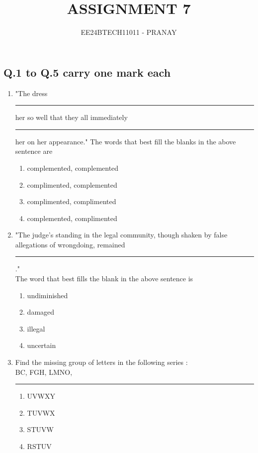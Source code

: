 \documentclass[journal,12pt,onecolumn]{IEEEtran}
\theoremstyle{remark}
\begin{document}

\vspace{3cm}

\title{ASSIGNMENT 7}
\author{EE24BTECH11011 - PRANAY}
\maketitle

\bigskip

\renewcommand{\thefigure}{\theenumi}
\renewcommand{\thetable}{\theenumi}
\subsection{\textbf{Q.1 to Q.5 carry one mark each}}
   \begin{enumerate}
  \item  "The dress \rule{3cm}{0.15mm} her so well that they all immediately \rule{3cm}{0.15mm} her on her
appearance."
The words that best fill the blanks in the above sentence are
\begin{enumerate}
    \item complemented, complemented
    \item complimented, complemented
    \item  complimented, complimented
    \item complemented, complimented
\end{enumerate}
\item "The judge's standing in the legal community, though shaken by false allegations of
wrongdoing, remained \rule{3cm}{0.15mm}."\\
The word that best fills the blank in the above sentence is
\begin{multicols}{4}
\begin{enumerate}
    \item  undiminished \item  damaged \item  illegal \item  uncertain
\end{enumerate}
\end{multicols}
\item Find the missing group of letters in the following series :\\
BC, FGH, LMNO, \rule{3cm}{0.15mm}
\begin{multicols}{4}
    \begin{enumerate}
        \item  UVWXY \item  TUVWX \item  STUVW \item  RSTUV

\end{enumerate}
\end{multicols}
\end{enumerate}
\end{document}
